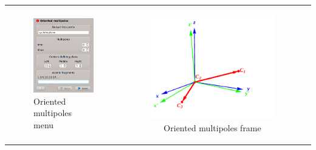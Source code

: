 \documentclass[10pt]{article}
\begin{document}
\begin{tabular}{lcr}
\begin{minipage}{.3\linewidth}
\begin{figure}[H]
\begin{center}
\includegraphics[width=.74\linewidth]{damqt_fig_2_12_1.png}
\end{center}
\vspace*{1.5cm}
\caption{{Oriented multipoles menu}\label{fig:2_12_1}}
\end{figure}
\end{minipage}
&
\begin{minipage}{.3\linewidth}
\vspace*{5mm}
\begin{figure}[H]
\begin{center}
\includegraphics[width=1.22\linewidth]{damqt_fig_2_12_2.png}
\end{center}
\vspace*{1.cm}
\caption{{Oriented multipoles frame}\label{fig:2_12_2}}
\end{figure}
\end{minipage}
\end{tabular}
\end{document}
